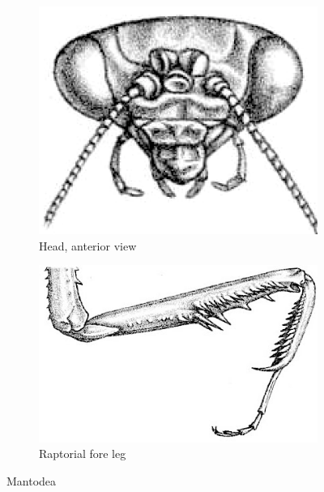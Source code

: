 \documentclass[letterpaper, 11pt]{article}
\begin{document}
\begin{figure}[ht!]
    \centering
    \begin{subfigure}[ht!]{0.35\textwidth}
        \includegraphics[width=\textwidth]{MantodeaHead}
        \caption{Head, anterior view \citep[modified from][Plate 130, Fig. 1a]{bhl24070}}
        \label{fig:mantodea1}
    \end{subfigure}
    \qquad
    \begin{subfigure}[ht!]{0.45\textwidth}
        \includegraphics[width=\textwidth]{MantodeaForeLeg}
        \caption{Raptorial fore leg \citep[modified from][Plate 130, Fig. 1f]{bhl24070}}
        \label{fig:mantodea2}
    \end{subfigure}
    \caption{Mantodea}\label{fig:mantodeans}
\end{figure}
\end{document}
